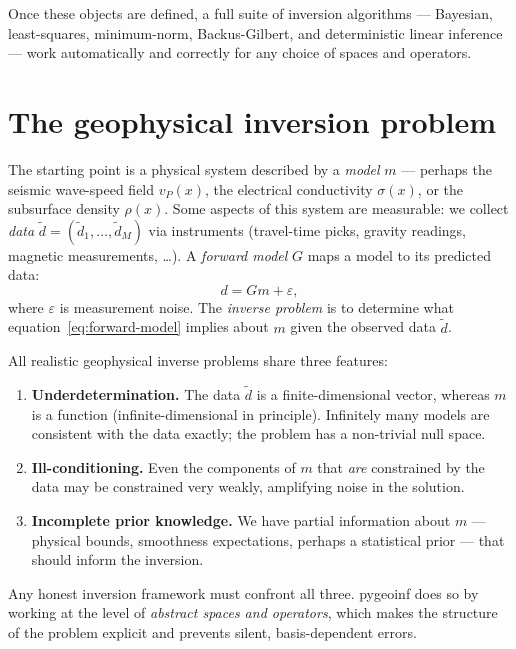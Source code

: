 \documentclass[11pt,twoside,openright]{book}
\theoremstyle{plain}
\theoremstyle{definition}
\theoremstyle{remark}
\begin{document}
Once these objects are defined, a full suite of inversion algorithms ---
Bayesian, least-squares, minimum-norm, Backus-Gilbert, and
deterministic linear inference --- work automatically and correctly
for any choice of spaces and operators.

\section{The geophysical inversion problem}
\label{sec:geophysical-inversion}

The starting point is a physical system described by a \emph{model}
$m$ --- perhaps the seismic wave-speed field $v_P(x)$, the electrical
conductivity $\sigma(x)$, or the subsurface density $\rho(x)$. Some
aspects of this system are measurable: we collect \emph{data}
$\tilde{d} = (\tilde{d}_1,\ldots,\tilde{d}_M)$ via instruments
(travel-time picks, gravity readings, magnetic measurements, \ldots).
A \emph{forward model} $G$ maps a model to its predicted data:
\begin{equation}
  \label{eq:forward-model}
  d = Gm + \varepsilon,
\end{equation}
where $\varepsilon$ is measurement noise. The \emph{inverse problem} is
to determine what equation~\eqref{eq:forward-model} implies about
$m$ given the observed data $\tilde{d}$.

All realistic geophysical inverse problems share three features:

\begin{enumerate}
  \item \textbf{Underdetermination.} The data $\tilde{d}$ is a
    finite-dimensional vector, whereas $m$ is a function (infinite-dimensional
    in principle). Infinitely many models are consistent with the data
    exactly; the problem has a non-trivial null space.
  \item \textbf{Ill-conditioning.} Even the components of $m$ that \emph{are}
    constrained by the data may be constrained very weakly, amplifying
    noise in the solution.
  \item \textbf{Incomplete prior knowledge.} We have partial information
    about $m$ --- physical bounds, smoothness expectations, perhaps a
    statistical prior --- that should inform the inversion.
\end{enumerate}

Any honest inversion framework must confront all three. pygeoinf does so
by working at the level of \emph{abstract spaces and operators}, which
makes the structure of the problem explicit and prevents silent,
basis-dependent errors.
\end{document}
